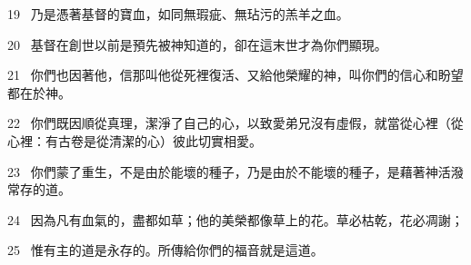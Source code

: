 19 
乃是憑著基督的寶血，如同無瑕疵、無玷污的羔羊之血。
\par
20 
基督在創世以前是預先被神知道的，卻在這末世才為你們顯現。
\par
21 
你們也因著他，信那叫他從死裡復活、又給他榮耀的神，叫你們的信心和盼望都在於神。
\par
22 
你們既因順從真理，潔淨了自己的心，以致愛弟兄沒有虛假，就當從心裡（從心裡：有古卷是從清潔的心）彼此切實相愛。
\par
23 
你們蒙了重生，不是由於能壞的種子，乃是由於不能壞的種子，是藉著神活潑常存的道。
\par
24 
因為凡有血氣的，盡都如草；他的美榮都像草上的花。草必枯乾，花必凋謝；
\par
25 
惟有主的道是永存的。所傳給你們的福音就是這道。


\bye

